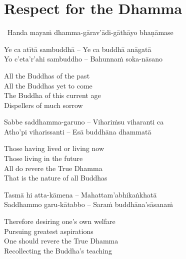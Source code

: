 \suttaRef{[Dhp 153-154]}




\section{Respect for the Dhamma}
\label{respect-for-the-dhamma}

\begin{leader}
  \anglebracketleft\ \hspace{-0.5mm}Handa mayaṁ dhamma-gārav'ādi-gāthāyo bhaṇāmase \hspace{-0.5mm}\anglebracketright\
\end{leader}

\begin{verses}
  Ye ca atītā sambuddhā – Ye ca buddhā anāgatā\\
  Yo c'eta'r'ahi sambuddho – Bahunnaṁ soka-nāsano
\end{verses}

\begin{english-verses}
  All the Buddhas of the past\\
  All the Buddhas yet to come\\
  The Buddha of this current age\\
  Dispellers of much sorrow
\end{english-verses}

\begin{verses}
  Sabbe saddhamma-garuno – Vihariṁsu viharanti ca\\
  Atho'pi viharissanti – Esā buddhāna dhammatā
\end{verses}

\begin{english-verses}
  Those having lived or living now\\
  Those living in the future\\
  All do revere the True Dhamma\\
  That is the nature of all Buddhas
\end{english-verses}

\begin{verses}
  Tasmā hi atta-kāmena – Mahattam'abhikaṅkhatā\\
  Saddhammo garu-kātabbo – Saraṁ buddhāna'sāsanaṁ
\end{verses}

\begin{english-verses}
  Therefore desiring one's own welfare\\
  Pursuing greatest aspirations\\
  One should revere the True Dhamma\\
  Recollecting the Buddha's teaching
\end{english-verses}

